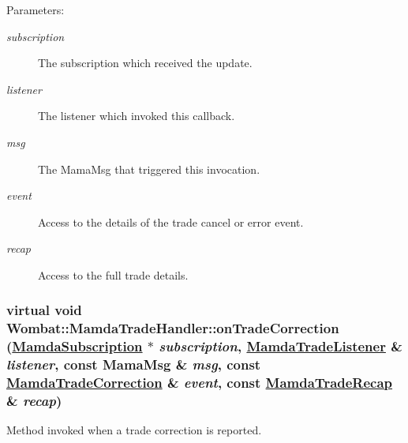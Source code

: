 \begin{Desc}
\item[Parameters:]
\begin{description}
\item[{\em subscription}]The subscription which received the update. \item[{\em listener}]The listener which invoked this callback. \item[{\em msg}]The Mama\-Msg that triggered this invocation. \item[{\em event}]Access to the details of the trade cancel or error event. \item[{\em recap}]Access to the full trade details. \end{description}
\end{Desc}
\hypertarget{classWombat_1_1MamdaTradeHandler_369167600f7eadb0a4509246eb912e4a}{
\subsubsection[onTradeCorrection]{\setlength{\rightskip}{0pt plus 5cm}virtual void Wombat::Mamda\-Trade\-Handler::on\-Trade\-Correction (\hyperlink{classWombat_1_1MamdaSubscription}{Mamda\-Subscription} $\ast$ {\em subscription}, \hyperlink{classWombat_1_1MamdaTradeListener}{Mamda\-Trade\-Listener} \& {\em listener}, const Mama\-Msg \& {\em msg}, const \hyperlink{classWombat_1_1MamdaTradeCorrection}{Mamda\-Trade\-Correction} \& {\em event}, const \hyperlink{classWombat_1_1MamdaTradeRecap}{Mamda\-Trade\-Recap} \& {\em recap})}}
\label{classWombat_1_1MamdaTradeHandler_369167600f7eadb0a4509246eb912e4a}


Method invoked when a trade correction is reported. 

